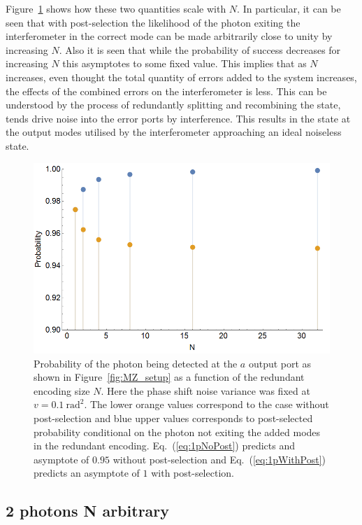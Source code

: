\documentclass[aps,pra,twocolumn,superscriptaddress,numerical,floatfix]{revtex4-1}
\begin{document}
Figure~\ref{fig:post vs no post} shows how these two quantities scale with $N$. In particular, it can be seen that with post-selection the likelihood of the photon exiting the interferometer in the correct mode can be made arbitrarily close to unity by increasing $N$. Also it is seen that while the probability of success decreases for increasing $N$ this asymptotes to some fixed value. This implies that as $N$ increases, even thought the total quantity of errors added to the system increases, the effects of the combined errors on the interferometer is less. This can be understood by the process of redundantly splitting and recombining the state, tends drive noise into the error ports by interference.  This results in the state at the output modes utilised by the interferometer approaching an ideal noiseless state.
\begin{figure}[tbh]
	\includegraphics[width=\columnwidth]{1photonpostvsnopost.png}
	\caption{\label{fig:post vs no post} Probability of the photon being detected at the $a$ output port as shown in Figure~\ref{fig:MZ_setup} as a function of the redundant encoding size $N$. Here the phase shift noise variance was fixed at $v=0.1\ \textrm{rad}^{2}$. The lower orange values correspond to the case without post-selection and blue upper values corresponds to post-selected probability conditional on the photon not exiting the added modes in the redundant encoding.  Eq.~(\ref{eq:1pNoPost}) predicts and asymptote of $0.95$ without post-selection and Eq.~(\ref{eq:1pWithPost}) predicts an asymptote of $1$ with post-selection.}
\end{figure}

\subsection{2 photons N arbitrary \label{2 photons N arbitrary}}
\end{document}
